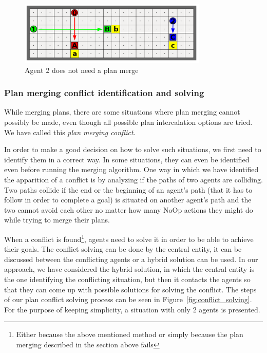 \begin{figure}[htb]
\begin{center}
 \includegraphics[width=0.8\textwidth]{figures/no_merge.png}
 \caption{Agent 2 does not need a plan merge}
 \label{fig:no_merge}
\end{center}
\end{figure}

\subsubsection{Plan merging conflict identification and solving}

While merging plans, there are some situations where plan merging cannot possibly be made, even though all
possible plan intercalation options are tried. We have called this \textit{plan merging conflict}.

In order to make a good decision on how to solve such situations, we first need to identify them in a correct
way. In some situations, they can even be identified even before running the merging algorithm. One way in
which we have identified the apparition of a conflict is by analyzing if the paths of two agents are
colliding. Two paths collide if the end or the beginning of an agent’s path (that it has to follow in order to
complete a goal) is situated on another agent’s path and the two cannot avoid each other no matter how many
NoOp actions they might do while trying to merge their plans.

When a conflict is found\footnote{Either because the above mentioned method or simply because the plan merging
described in the section above fails}, agents need to solve it in order to be able to achieve their goals. The
conflict solving can be done by the central entity, it can be discussed between the conflicting agents or a
hybrid solution can be used. In our approach, we have considered the hybrid solution, in which the central
entity is the one identifying the conflicting situation, but then it contacts the agents so that they can come
up with possible solutions for solving the conflict. The steps of our plan conflict solving process can be
seen in Figure~\ref{fig:conflict_solving}. For the purpose of keeping simplicity, a situation with only 2
agents is presented.

